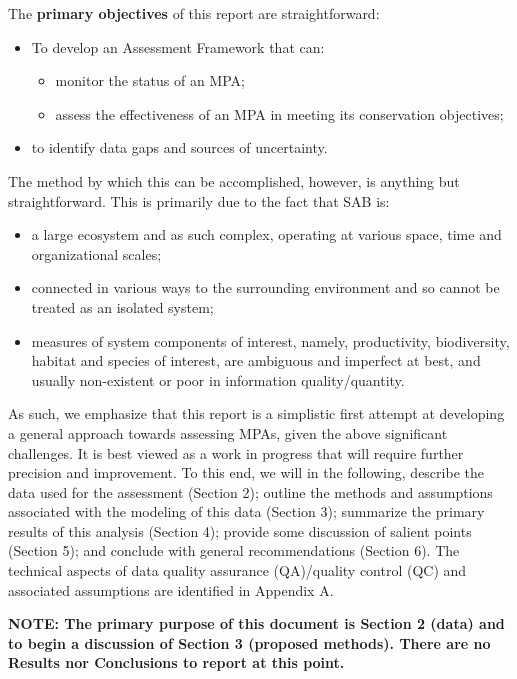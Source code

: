 \documentclass[letterpaper,portrait,11pt]{scrartcl}
\numberwithin{equation}{section}		%
\numberwithin{figure}{section}		%
\numberwithin{table}{section}				%
\begin{document}
The \textbf{primary objectives} of this report are straightforward:

\begin{itemize}
	\item To develop an Assessment Framework that can:
  \begin{itemize}
    \item	monitor the status of an MPA;
  	\item assess the effectiveness of an MPA in meeting its conservation objectives;
  \end{itemize}
  \item to identify data gaps and sources of uncertainty. 
\end{itemize}

The method by which this can be accomplished, however, is anything but straightforward. This is primarily due to the fact that SAB is:

\begin{itemize}
	\item a large ecosystem and as such complex, operating at various space, time and organizational scales;
	\item connected in various ways to the surrounding environment and so cannot be treated as an isolated system;
	\item measures of system components of interest, namely, productivity, biodiversity, habitat and species of interest, are ambiguous and imperfect at best, and usually non-existent or poor in information quality/quantity.
\end{itemize}


As such, we emphasize that this report is a simplistic first attempt at developing a general approach towards assessing MPAs, given the above significant challenges. It is best viewed as a work in progress that will require further precision and improvement. To this end, we will in the following, describe the data used for the assessment (Section 2); outline the methods and assumptions associated with the modeling of this data (Section 3); summarize the primary results of this analysis (Section 4); provide some discussion of salient points (Section 5); and conclude with general recommendations (Section 6). The technical aspects of data quality assurance (QA)/quality control (QC) and associated assumptions are identified in Appendix A. 

\medskip

\textbf{NOTE: The primary purpose of this document is Section 2 (data) and to begin a discussion of Section 3 (proposed methods). There are no Results nor Conclusions to report at this point. }
\end{document}
